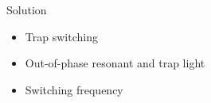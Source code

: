 \documentclass{beamer}
\begin{document}

\begin{frame}
  \begin{columns}
    \column{5cm}
    \begin{block}{Solution}
      \begin{itemize}
      \item<2-> Trap switching %
      \item<3-> Out-of-phase resonant and trap light %
      \item<4-> Switching frequency
      \end{itemize}
    \end{block}
    \column{7cm}
    \begin{center}
    \end{center}
  \end{columns}
\end{frame}


\begin{frame}[t]
\end{frame}

\begin{frame}
\end{frame}

\begin{frame}
\end{frame}
\end{document}
